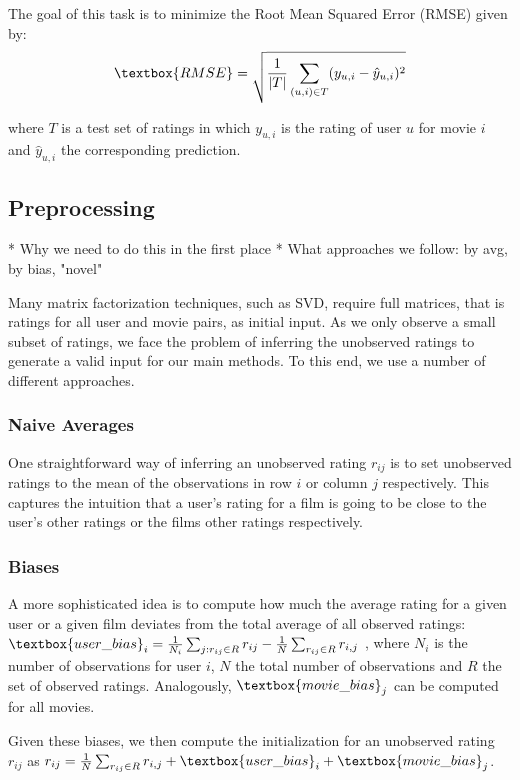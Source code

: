 \documentclass[10pt,conference,compsocconf]{IEEEtran}
\begin{document}
The goal of this task is to minimize the Root Mean Squared Error (RMSE) given by:
\begin{equation}
\textbox{RMSE} = \sqrt{\frac{1}{|T|}\sum_{(u, i) \in T} (y_{u,i} -\hat y_{u,i})^2}    
\end{equation}

where $T$ is a test set of ratings in which $y_{u, i}$ is the rating of user $u$ for movie $i$ and $\hat y_{u,i}$ the corresponding prediction. 

\subsection{Preprocessing}

* Why we need to do this in the first place
* What approaches we follow:
    by avg, by bias, "novel"
    
Many matrix factorization techniques, such as SVD, require full matrices, that is ratings for all user and movie pairs, as initial input. As we only observe a small subset of ratings, we face the problem of inferring the unobserved ratings to generate a valid input for our main methods. To this end, we use a number of different approaches.

\subsubsection{Naive Averages}
One straightforward way of inferring an unobserved rating $r_{ij}$ is to set unobserved ratings to the mean of the observations in row $i$ or column $j$ respectively. This captures the intuition that a user's rating for a film is going to be close to the user's other ratings or the films other ratings respectively.

\subsubsection{Biases}
A more sophisticated idea is to compute how much the average rating for a given user or a given film deviates from the total average of all observed ratings: $\textbox{user\_bias}_i = \frac{1}{N_i} \sum_{j : r_{ij} \in R} r_{ij} - \frac{1}{N} \sum_{r_{ij} \in R} r_{i,j}$ , where $N_i$ is the number of observations for user $i$, $N$ the total number of observations and $R$ the set of observed ratings. Analogously, $\textbox{movie\_bias}_j$ can be computed for all movies. 

Given these biases, we then compute the initialization for an unobserved rating $r_{ij}$ as $r_{ij} = \frac{1}{N} \sum_{r_{ij} \in R} r_{i,j} + \textbox{user\_bias}_i + \textbox{movie\_bias}_j$.
\end{document}
